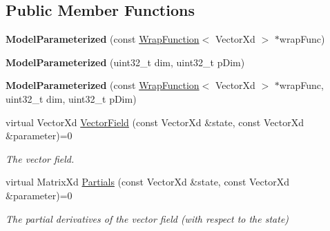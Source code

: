 \subsection*{Public Member Functions}
\begin{DoxyCompactItemize}
\item 
\hypertarget{struct_d_r_d_s_p_1_1_model_parameterized_a0cd93ae8805e21e731e65a732048c2b7}{{\bfseries Model\-Parameterized} (const \hyperlink{struct_d_r_d_s_p_1_1_wrap_function}{Wrap\-Function}$<$ Vector\-Xd $>$ $\ast$wrap\-Func)}\label{struct_d_r_d_s_p_1_1_model_parameterized_a0cd93ae8805e21e731e65a732048c2b7}

\item 
\hypertarget{struct_d_r_d_s_p_1_1_model_parameterized_ad23b430d7e7494f9c2142097391fc01d}{{\bfseries Model\-Parameterized} (uint32\-\_\-t dim, uint32\-\_\-t p\-Dim)}\label{struct_d_r_d_s_p_1_1_model_parameterized_ad23b430d7e7494f9c2142097391fc01d}

\item 
\hypertarget{struct_d_r_d_s_p_1_1_model_parameterized_a2f6be3362a944408c097b5981e6fbbaa}{{\bfseries Model\-Parameterized} (const \hyperlink{struct_d_r_d_s_p_1_1_wrap_function}{Wrap\-Function}$<$ Vector\-Xd $>$ $\ast$wrap\-Func, uint32\-\_\-t dim, uint32\-\_\-t p\-Dim)}\label{struct_d_r_d_s_p_1_1_model_parameterized_a2f6be3362a944408c097b5981e6fbbaa}

\item 
\hypertarget{struct_d_r_d_s_p_1_1_model_parameterized_a7fc3a7f0f10a3e4215bf67cb6e302e05}{virtual Vector\-Xd \hyperlink{struct_d_r_d_s_p_1_1_model_parameterized_a7fc3a7f0f10a3e4215bf67cb6e302e05}{Vector\-Field} (const Vector\-Xd \&state, const Vector\-Xd \&parameter)=0}\label{struct_d_r_d_s_p_1_1_model_parameterized_a7fc3a7f0f10a3e4215bf67cb6e302e05}

\begin{DoxyCompactList}\small\item\em The vector field. \end{DoxyCompactList}\item 
\hypertarget{struct_d_r_d_s_p_1_1_model_parameterized_a1aa9163a2e1e92e8bc2e644832721de7}{virtual Matrix\-Xd \hyperlink{struct_d_r_d_s_p_1_1_model_parameterized_a1aa9163a2e1e92e8bc2e644832721de7}{Partials} (const Vector\-Xd \&state, const Vector\-Xd \&parameter)=0}\label{struct_d_r_d_s_p_1_1_model_parameterized_a1aa9163a2e1e92e8bc2e644832721de7}

\begin{DoxyCompactList}\small\item\em The partial derivatives of the vector field (with respect to the state) \end{DoxyCompactList}\end{DoxyCompactItemize}
